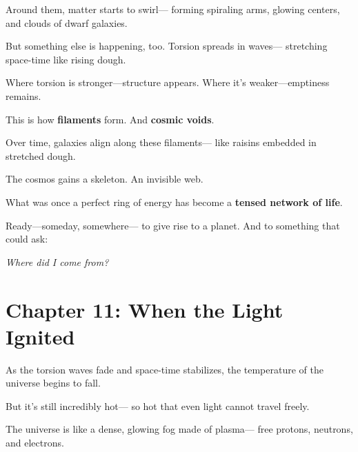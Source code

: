 \documentclass{article}
\begin{document}
\vspace{1ex}
\noindent
Around them, matter starts to swirl—  
forming spiraling arms, glowing centers,  
and clouds of dwarf galaxies.

\vspace{1ex}
\noindent
But something else is happening, too.  
Torsion spreads in waves—  
stretching space-time like rising dough.

\vspace{1ex}
\noindent
Where torsion is stronger—structure appears.  
Where it’s weaker—emptiness remains.

\vspace{1ex}
\noindent
This is how \textbf{filaments} form.  
And \textbf{cosmic voids}.

\vspace{1ex}
\noindent
Over time, galaxies align along these filaments—  
like raisins embedded in stretched dough.

\vspace{1ex}
\noindent
The cosmos gains a skeleton.  
An invisible web.

\vspace{1ex}
\noindent
What was once a perfect ring of energy  
has become a \textbf{tensed network of life}.

\vspace{1ex}
\noindent
Ready—someday, somewhere—  
to give rise to a planet.  
And to something that could ask:

\vspace{1ex}
\begin{center}
\textit{Where did I come from?}
\end{center}




\section*{Chapter 11: When the Light Ignited}

\noindent
As the torsion waves fade and space-time stabilizes,  
the temperature of the universe begins to fall.

\vspace{1ex}
\noindent
But it’s still incredibly hot—  
so hot that even light cannot travel freely.

\vspace{1ex}
\noindent
The universe is like a dense, glowing fog  
made of plasma—  
free protons, neutrons, and electrons.
\end{document}
